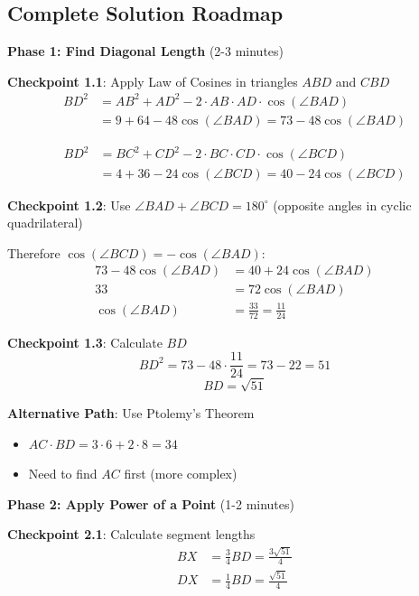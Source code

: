 \documentclass[]{article}
\begin{document}
\begin{solutionbox}
\subsection*{Complete Solution Roadmap}

\textbf{Phase 1: Find Diagonal Length} (2-3 minutes)

\textbf{Checkpoint 1.1}: Apply Law of Cosines in triangles $ABD$ and $CBD$
\begin{align*}
BD^2 &= AB^2 + AD^2 - 2 \cdot AB \cdot AD \cdot \cos(\angle BAD)\\
     &= 9 + 64 - 48\cos(\angle BAD) = 73 - 48\cos(\angle BAD)
\end{align*}

\begin{align*}
BD^2 &= BC^2 + CD^2 - 2 \cdot BC \cdot CD \cdot \cos(\angle BCD)\\
     &= 4 + 36 - 24\cos(\angle BCD) = 40 - 24\cos(\angle BCD)
\end{align*}

\textbf{Checkpoint 1.2}: Use $\angle BAD + \angle BCD = 180^\circ$ (opposite angles in cyclic quadrilateral)

Therefore $\cos(\angle BCD) = -\cos(\angle BAD)$:
\begin{align*}
73 - 48\cos(\angle BAD) &= 40 + 24\cos(\angle BAD)\\
33 &= 72\cos(\angle BAD)\\
\cos(\angle BAD) &= \frac{33}{72} = \frac{11}{24}
\end{align*}

\textbf{Checkpoint 1.3}: Calculate $BD$
\[BD^2 = 73 - 48 \cdot \frac{11}{24} = 73 - 22 = 51\]
\[BD = \sqrt{51}\]

\textbf{Alternative Path}: Use Ptolemy's Theorem
\begin{itemize}
    \item $AC \cdot BD = 3 \cdot 6 + 2 \cdot 8 = 34$
    \item Need to find $AC$ first (more complex)
\end{itemize}

\hrulefill

\textbf{Phase 2: Apply Power of a Point} (1-2 minutes)

\textbf{Checkpoint 2.1}: Calculate segment lengths
\begin{align*}
BX &= \frac{3}{4}BD = \frac{3\sqrt{51}}{4}\\
DX &= \frac{1}{4}BD = \frac{\sqrt{51}}{4}
\end{align*}


\end{solutionbox}
\end{document}
